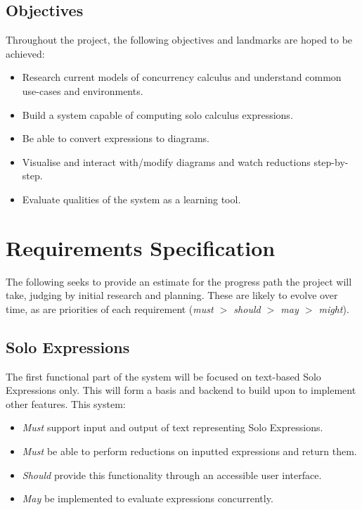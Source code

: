 \documentclass{article}
\begin{document}
\subsection{Objectives}
Throughout the project, the following objectives and landmarks are hoped to be achieved:
\begin{itemize}
	\item Research current models of concurrency calculus and understand common use-cases and environments.
	\item Build a system capable of computing solo calculus expressions.
	\item Be able to convert expressions to diagrams.
	\item Visualise and interact with/modify diagrams and watch reductions step-by-step.
	\item Evaluate qualities of the system as a learning tool.
\end{itemize}


\section{Requirements Specification}
The following seeks to provide an estimate for the progress path the project will take, judging by initial research and planning. These are likely to evolve over time, as are priorities of each requirement (\textit{must $>$ should $>$ may $>$ might}).

\subsection{Solo Expressions}
The first functional part of the system will be focused on text-based Solo Expressions only. This will form a basis and backend to build upon to implement other features.
This system:
\begin{itemize}
	\item \textit{Must} support input and output of text representing Solo Expressions.
	\item \textit{Must} be able to perform reductions on inputted expressions and return them.
	\item \textit{Should} provide this functionality through an accessible user interface.
	\item \textit{May} be implemented to evaluate expressions concurrently.
\end{itemize}
\end{document}
